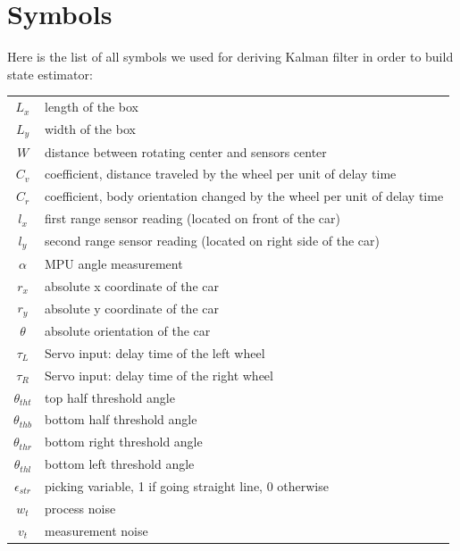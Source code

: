 \documentclass[12pt, letterpaper]{amsart} %
\numberwithin{equation}{section}
\begin{document}
\section{Symbols}
Here is the list of all symbols we used for deriving Kalman filter in order to build state estimator:
\\
\begin{tabular}{c p{}}
  $L_x$ & length of the box  \\
  $L_y$ & width of the box \\
  $W$ & distance between rotating center and sensors center \\
  $C_v$ & coefficient, distance traveled by the wheel per unit of delay time \\
  $C_r$ & coefficient, body orientation changed by the wheel per unit of delay time \\
  $l_x$ & first range sensor reading (located on front of the car) \\
  $l_y$ & second range sensor reading (located on right side of the car) \\
  $\alpha$ & MPU angle measurement \\
  $r_x$ & absolute x coordinate of the car \\
  $r_y$ & absolute y coordinate of the car \\
  $\theta$ & absolute orientation of the car \\
  $\tau_L$ & Servo input: delay time of the left wheel \\
  $\tau_R$ & Servo input: delay time of the right wheel \\
  $\theta_{tht}$ & top half threshold angle \\
  $\theta_{thb}$ & bottom half threshold angle \\
  $\theta_{thr}$ & bottom right threshold angle \\
  $\theta_{thl}$ & bottom left threshold angle \\
  $\epsilon_{str}$ & picking variable, 1 if going straight line, 0 otherwise \\
  $w_t$ & process noise \\
  $v_t$ & measurement noise
\end{tabular}\\
\\ \\ \\ \\ \\ \\
\end{document}
